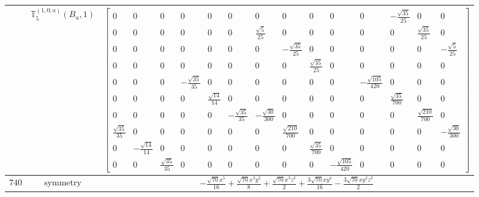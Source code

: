 \documentclass[fleqn,8pt,landscape]{jsarticle}
\begin{document}
\begin{longtable}{ccc}
$  $ & $ \mathbb{T}_{5}^{(1,0;a)}(B_{u},1) $ & $ \begin{bmatrix} 0 & 0 & 0 & 0 & 0 & 0 & 0 & 0 & 0 & 0 & 0 & - \frac{\sqrt{35}}{25} & 0 & 0 \\ 0 & 0 & 0 & 0 & 0 & 0 & \frac{\sqrt{5}}{25} & 0 & 0 & 0 & 0 & 0 & \frac{\sqrt{35}}{25} & 0 \\ 0 & 0 & 0 & 0 & 0 & 0 & 0 & - \frac{\sqrt{35}}{25} & 0 & 0 & 0 & 0 & 0 & - \frac{\sqrt{5}}{25} \\ 0 & 0 & 0 & 0 & 0 & 0 & 0 & 0 & \frac{\sqrt{35}}{25} & 0 & 0 & 0 & 0 & 0 \\ 0 & 0 & 0 & - \frac{\sqrt{35}}{35} & 0 & 0 & 0 & 0 & 0 & 0 & - \frac{\sqrt{105}}{420} & 0 & 0 & 0 \\ 0 & 0 & 0 & 0 & \frac{\sqrt{14}}{14} & 0 & 0 & 0 & 0 & 0 & 0 & \frac{\sqrt{35}}{700} & 0 & 0 \\ 0 & 0 & 0 & 0 & 0 & - \frac{\sqrt{35}}{35} & - \frac{\sqrt{30}}{300} & 0 & 0 & 0 & 0 & 0 & \frac{\sqrt{210}}{700} & 0 \\ \frac{\sqrt{35}}{35} & 0 & 0 & 0 & 0 & 0 & 0 & \frac{\sqrt{210}}{700} & 0 & 0 & 0 & 0 & 0 & - \frac{\sqrt{30}}{300} \\ 0 & - \frac{\sqrt{14}}{14} & 0 & 0 & 0 & 0 & 0 & 0 & \frac{\sqrt{35}}{700} & 0 & 0 & 0 & 0 & 0 \\ 0 & 0 & \frac{\sqrt{35}}{35} & 0 & 0 & 0 & 0 & 0 & 0 & - \frac{\sqrt{105}}{420} & 0 & 0 & 0 & 0 \end{bmatrix} $ \\ \hline
$ 740 $ & $ \text{symmetry} $ & $ - \frac{\sqrt{70} x^{5}}{16} + \frac{\sqrt{70} x^{3} y^{2}}{8} + \frac{\sqrt{70} x^{3} z^{2}}{2} + \frac{3 \sqrt{70} x y^{4}}{16} - \frac{3 \sqrt{70} x y^{2} z^{2}}{2} $ \\

\end{longtable}
\end{document}
